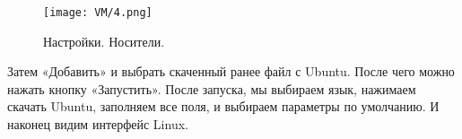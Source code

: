 \begin{figure}[h]
		\centering
		\texttt{[image: VM/4.png]}
\caption{Настройки. Носители.}
\label{ris:image}

\end{figure}

\quad Затем «Добавить» и выбрать скаченный ранее файл с Ubuntu. После чего можно нажать кнопку «Запустить». После запуска, мы выбираем язык, нажимаем скачать Ubuntu, заполняем все поля, и выбираем параметры по умолчанию. И наконец видим интерфейс Linux.
